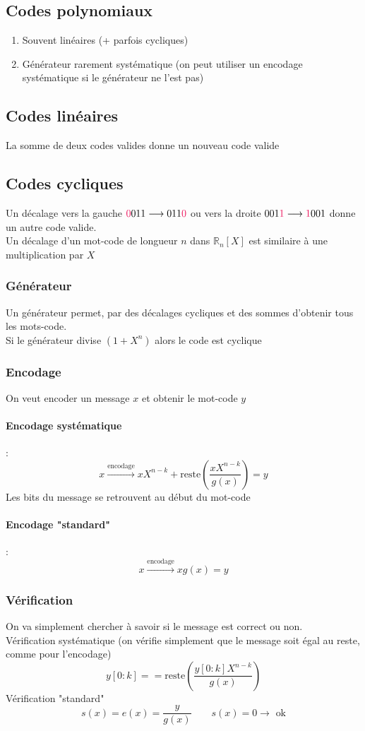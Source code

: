 \documentclass[resume.tex]{subfiles}
\begin{document}
\subsection{Codes polynomiaux}
\begin{enumerate}
\item Souvent linéaires (+ parfois cycliques)
\item Générateur rarement systématique (on peut utiliser un encodage systématique si le générateur ne l'est pas)
\end{enumerate}
\subsection{Codes linéaires}
La somme de deux codes valides donne un nouveau code valide
\subsection{Codes cycliques}
Un décalage vers la gauche $\textcolor{OrangeRed}{0}011\longrightarrow 011\textcolor{OrangeRed}{0}$ ou vers la droite $001\textcolor{OrangeRed}{1}\longrightarrow \textcolor{OrangeRed}{1}001$ donne un autre code valide.\\
Un décalage d'un mot-code de longueur $n$ dans $\mathbb{R}_n[X]$ est similaire à une multiplication par $X$
\subsubsection{Générateur}
Un générateur permet, par des décalages cycliques et des sommes d'obtenir tous les mots-code.\\
Si le générateur divise $(1+X^n)$ alors le code est cyclique
\subsubsection{Encodage}
On veut encoder un message $x$ et obtenir le mot-code $y$
\paragraph{Encodage systématique} :
$$x\xrightarrow{\text{encodage}} xX^{n-k}+\text{reste}\left(\frac{xX^{n-k}}{g(x)}\right)=y$$
Les bits du message se retrouvent au début du mot-code
\paragraph{Encodage "standard"} :
$$x\xrightarrow{\text{encodage}} xg(x)=y$$
\subsubsection{Vérification}
On va simplement chercher à savoir si le message est correct ou non.\\
Vérification systématique (on vérifie simplement que le message soit égal au reste, comme pour l'encodage)
$$y[0:k] == \text{reste}\left(\frac{y[0:k]X^{n-k}}{g(x)}\right)$$
Vérification "standard"
$$s(x)=e(x)=\frac{y}{g(x)}\qquad s(x)=0\longrightarrow\text{ ok}$$
\end{document}

